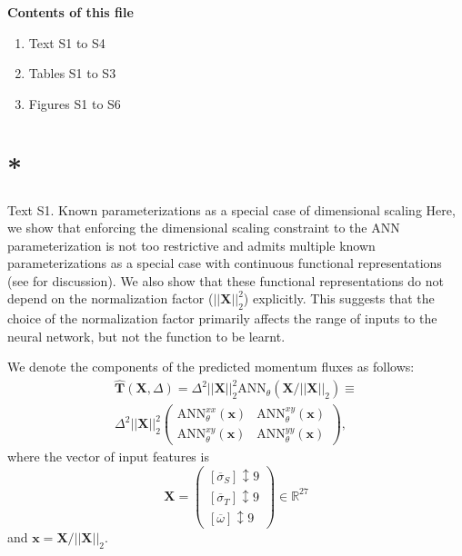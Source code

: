 \documentclass[draft,grl]{agutexSI2019}
\begin{document}
\begin{article}


\noindent\textbf{Contents of this file}
\begin{enumerate}
\item Text S1 to S4
\item Tables S1 to S3
\item Figures S1 to S6
\end{enumerate}



\newpage

\section{*}{Text S1. Known parameterizations as a special case of dimensional scaling}
Here, we show that enforcing the dimensional scaling constraint to the ANN parameterization is not too restrictive and admits multiple known parameterizations as a special case with continuous functional representations (see  for discussion). We also show that these functional representations do not depend on the normalization factor ($||\mathbf{X}||_2^2$) explicitly. This suggests that the choice of the normalization factor primarily affects the range of inputs to the neural network, but not the function to be learnt. %

We denote the components of the predicted momentum fluxes as follows:
\begin{gather}
    \widehat{\mathbf{T}}(\mathbf{X}, \Delta) = \Delta^2 ||\mathbf{X}||_2^2 \mathrm{ANN}_{\theta} (\mathbf{X} / ||\mathbf{X}||_2) \equiv \\ 
    \Delta^2 ||\mathbf{X}||_2^2 \begin{pmatrix}
        \mathrm{ANN}_{\theta}^{xx} (\mathbf{x}) & \mathrm{ANN}_{\theta}^{xy} (\mathbf{x}) \\
        \mathrm{ANN}_{\theta}^{xy} (\mathbf{x}) & \mathrm{ANN}_{\theta}^{yy} (\mathbf{x})
    \end{pmatrix}, \label{eq:second_ANN_equation}
\end{gather}
where the vector of input features is
\begin{equation}
    \mathbf{X} =
    \begin{pmatrix}
        \left[ \overline{\sigma}_S \right]{\updownarrow \scriptstyle 9}  \\
        \left[ \overline{\sigma}_T \right]{\updownarrow \scriptstyle 9} \\
        \left[ \overline{\omega} \right]{\updownarrow \scriptstyle 9}
    \end{pmatrix} \in \mathbb{R}^{27}
\end{equation}
and $\mathbf{x}=\mathbf{X} / ||\mathbf{X}||_2$.


\end{article}
\end{document}
